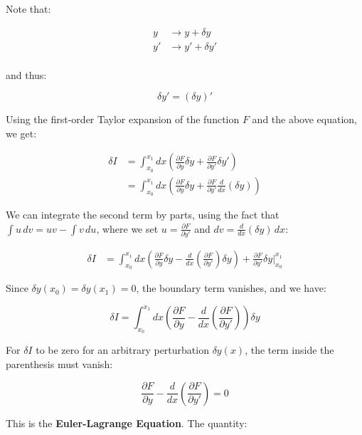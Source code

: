 Note that:

\begin{align*}
    y &\rightarrow y + \delta y \\
    y' &\rightarrow y' + \delta y' \\
\end{align*}

and thus:

\[
    \delta y' = (\delta y)'
\]

Using the first-order Taylor expansion of the function $F$ and the above equation, we get:

\begin{align*}
    \delta I &= \int_{x_0}^{x_1} dx \left( \frac{\partial F}{\partial y} \delta y + \frac{\partial F}{\partial y'} \delta y' \right) \\
    &= \int_{x_0}^{x_1} dx \left( \frac{\partial F}{\partial y} \delta y + \frac{\partial F}{\partial y'} \frac{d}{dx}(\delta y) \right)
\end{align*}

We can integrate the second term by parts, using the fact that 
$\int u \, dv = uv - \int v \, du$, where we set $u = \frac{\partial F}{\partial y'}$ 
and $dv = \frac{d}{dx}(\delta y)\, dx$:

\begin{align*}
    \delta I &= \int_{x_0}^{x_1} dx \left( \frac{\partial F}{\partial y} \delta y - \frac{d}{dx} \left(\frac{\partial F}{\partial y'}\right) \delta y \right) + \frac{\partial F}{\partial y'} \delta y \bigg|_{x_0}^{x_1}
\end{align*}

Since $\delta y(x_0) = \delta y(x_1) = 0$, the boundary term vanishes, and we have:

\begin{equation}
    \delta I = \int_{x_0}^{x_1} dx \left( \frac{\partial F}{\partial y} - \frac{d}{dx} \left(\frac{\partial F}{\partial y'}\right) \right) \delta y
\end{equation}

For $\delta I$ to be zero for an arbitrary perturbation $\delta y(x)$, the term inside
the parenthesis must vanish:

\begin{equation}
    \frac{\partial F}{\partial y} - \frac{d}{dx} \left(\frac{\partial F}{\partial y'}\right) = 0
\end{equation}

This is the \textbf{Euler-Lagrange Equation}. The quantity:

